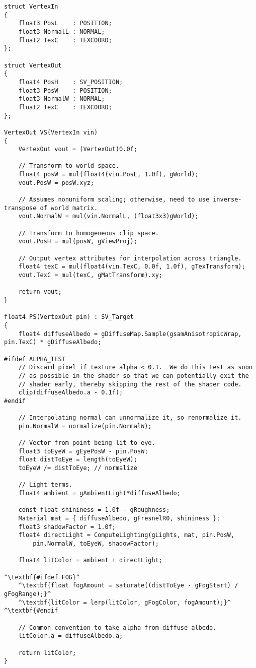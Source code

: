 \begin{lstlisting}[escapechar=^]
struct VertexIn
{
    float3 PosL    : POSITION;
    float3 NormalL : NORMAL;
    float2 TexC    : TEXCOORD;
};

struct VertexOut
{
    float4 PosH    : SV_POSITION;
    float3 PosW    : POSITION;
    float3 NormalW : NORMAL;
    float2 TexC    : TEXCOORD;
};

VertexOut VS(VertexIn vin)
{
    VertexOut vout = (VertexOut)0.0f;
    
    // Transform to world space.
    float4 posW = mul(float4(vin.PosL, 1.0f), gWorld);
    vout.PosW = posW.xyz;

    // Assumes nonuniform scaling; otherwise, need to use inverse-transpose of world matrix.
    vout.NormalW = mul(vin.NormalL, (float3x3)gWorld);

    // Transform to homogeneous clip space.
    vout.PosH = mul(posW, gViewProj);
    
    // Output vertex attributes for interpolation across triangle.
    float4 texC = mul(float4(vin.TexC, 0.0f, 1.0f), gTexTransform);
    vout.TexC = mul(texC, gMatTransform).xy;

    return vout;
}

float4 PS(VertexOut pin) : SV_Target
{
    float4 diffuseAlbedo = gDiffuseMap.Sample(gsamAnisotropicWrap, pin.TexC) * gDiffuseAlbedo;
    
#ifdef ALPHA_TEST
    // Discard pixel if texture alpha < 0.1.  We do this test as soon 
    // as possible in the shader so that we can potentially exit the
    // shader early, thereby skipping the rest of the shader code.
    clip(diffuseAlbedo.a - 0.1f);
#endif

    // Interpolating normal can unnormalize it, so renormalize it.
    pin.NormalW = normalize(pin.NormalW);

    // Vector from point being lit to eye. 
    float3 toEyeW = gEyePosW - pin.PosW;
    float distToEye = length(toEyeW);
    toEyeW /= distToEye; // normalize

    // Light terms.
    float4 ambient = gAmbientLight*diffuseAlbedo;

    const float shininess = 1.0f - gRoughness;
    Material mat = { diffuseAlbedo, gFresnelR0, shininess };
    float3 shadowFactor = 1.0f;
    float4 directLight = ComputeLighting(gLights, mat, pin.PosW,
        pin.NormalW, toEyeW, shadowFactor);

    float4 litColor = ambient + directLight;

^\textbf{#ifdef FOG}^
    ^\textbf{float fogAmount = saturate((distToEye - gFogStart) / gFogRange);}^
    ^\textbf{litColor = lerp(litColor, gFogColor, fogAmount);}^
^\textbf{#endif

    // Common convention to take alpha from diffuse albedo.
    litColor.a = diffuseAlbedo.a;

    return litColor;
}
\end{lstlisting}


